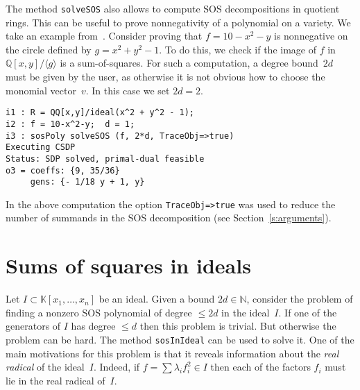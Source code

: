 \documentclass[11pt]{amsart}
\theoremstyle{plain}%
\theoremstyle{definition}
\theoremstyle{remark}
\newcommand{\SOS}{\textsc{SOS}\xspace}
\newcommand{\QQ}{\mathbb{Q}}
\newcommand{\NN}{\mathbb{N}}
\newcommand{\kk}{\mathbb{K}}
\begin{document}
The method \verb|solveSOS| also allows to compute SOS decompositions in quotient rings.
This can be useful to prove nonnegativity of a polynomial on a variety.
We take an example from~\cite{parrilo2005exploiting}.
Consider proving that $f = 10{-}x^2{-}y$ is nonnegative on the circle defined by $g = x^2 {+} y^2 {-} 1$.
To do this, we check if the image of $f$ in $\QQ[x,y]/\langle g\rangle$ is a sum-of-squares.
For such a computation, a degree bound~$2d$ must be given by the user, as otherwise it is not obvious how to choose the monomial vector~$v$.
In this case we set $2d=2$.
{\small
\begin{verbatim}
i1 : R = QQ[x,y]/ideal(x^2 + y^2 - 1);
i2 : f = 10-x^2-y;  d = 1;
i3 : sosPoly solveSOS (f, 2*d, TraceObj=>true)
Executing CSDP
Status: SDP solved, primal-dual feasible
o3 = coeffs: {9, 35/36}
     gens: {- 1/18 y + 1, y}
\end{verbatim}
}
\noindent
In the above computation the option \verb|TraceObj=>true| was used to reduce the number of summands in the SOS decomposition (see Section~\ref{s:arguments}).


\section{Sums of squares in ideals}
Let $I \subset \kk[x_{1},\dots,x_{n}]$ be an ideal.  
Given a bound $2d\in\NN$, consider the problem of finding a nonzero SOS polynomial of degree $\leq \!2d$ in the ideal~$I$.
If one of the generators of $I$ has degree $\leq \!d$ then this problem is trivial.
But otherwise the problem can be hard.
The method \verb|sosInIdeal| can be used to solve it.
One of the main motivations for this problem is that it reveals information about the \emph{real radical} of the ideal~$I$.
Indeed, if $f = \sum \lambda_i f_i^2 \in I$ then each of the factors $f_i$ must lie in the real radical of~$I$.
\end{document}
